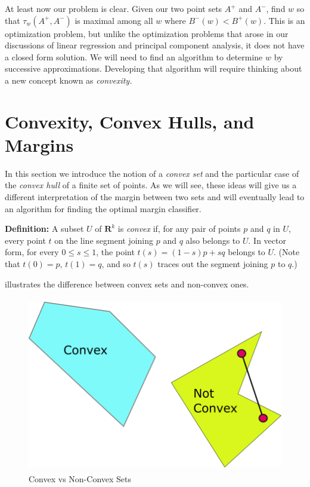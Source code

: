 \documentclass[
  oneside]{scrbook}
\begin{document}
At least now our problem is clear. Given our two point sets \(A^{+}\)
and \(A^{-}\), find \(w\) so that \(\tau_{w}(A^{+},A^{-})\) is maximal
among all \(w\) where \(B^{-}(w)<B^{+}(w)\). This is an optimization
problem, but unlike the optimization problems that arose in our
discussions of linear regression and principal component analysis, it
does not have a closed form solution. We will need to find an algorithm
to determine \(w\) by successive approximations. Developing that
algorithm will require thinking about a new concept known as
\emph{convexity.}

\hypertarget{convexity-convex-hulls-and-margins}{%
\section{Convexity, Convex Hulls, and
Margins}\label{convexity-convex-hulls-and-margins}}

In this section we introduce the notion of a \emph{convex set} and the
particular case of the \emph{convex hull} of a finite set of points. As
we will see, these ideas will give us a different interpretation of the
margin between two sets and will eventually lead to an algorithm for
finding the optimal margin classifier.

\textbf{Definition:} A subset \(U\) of \(\mathbf{R}^{k}\) is
\emph{convex} if, for any pair of points \(p\) and \(q\) in \(U\), every
point \(t\) on the line segment joining \(p\) and \(q\) also belongs to
\(U\). In vector form, for every \(0\le s\le 1\), the point
\(t(s) = (1-s)p+sq\) belongs to \(U\). (Note that \(t(0)=p\),
\(t(1)=q\), and so \(t(s)\) traces out the segment joining \(p\) to
\(q\).)

 illustrates the difference between convex
sets and non-convex ones.

\begin{figure}
\hypertarget{fig:convexnotconvex}{%
\centering
\includegraphics[width=\textwidth,height=3in]{img/ConvexNotConvex.png}
\caption{Convex vs Non-Convex Sets}\label{fig:convexnotconvex}
}
\end{figure}
\end{document}
